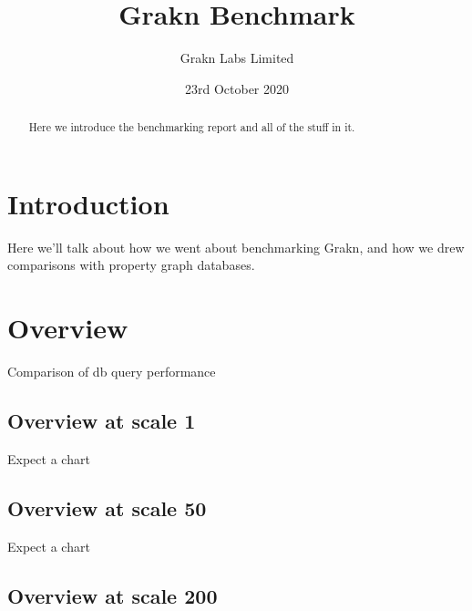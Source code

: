 \documentclass{article}
\begin{document}
\title{Grakn Benchmark}
\date{23rd October 2020}
\author{Grakn Labs Limited}

\maketitle

\begin{abstract}
Here we introduce the benchmarking report and all of the stuff in it.
\end{abstract}

\section{Introduction}
Here we'll talk about how we went about benchmarking Grakn, and how we drew comparisons with property graph databases.

\section{Overview}
Comparison of db query performance

\subsection{Overview at scale 1}

Expect a chart

\subsection{Overview at scale 50}

Expect a chart

\subsection{Overview at scale 200}
\end{document}
